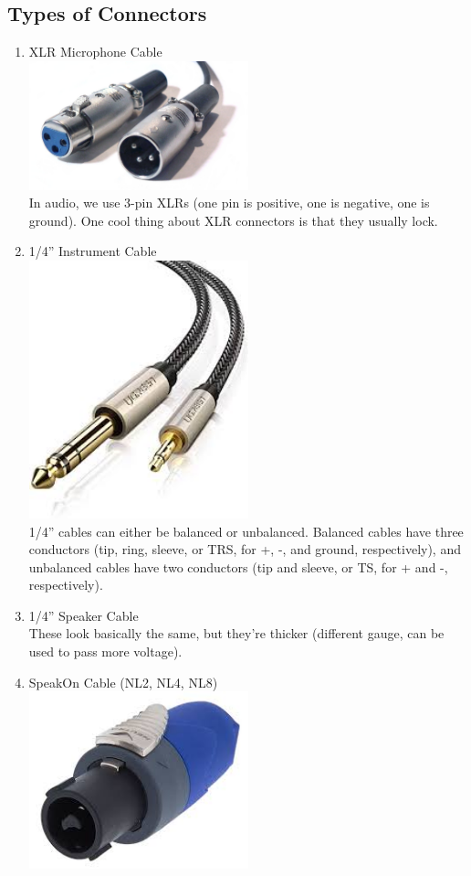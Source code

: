 \documentclass[a4paper]{article}
\begin{document}
\subsection{Types of Connectors}
\begin{enumerate}
	\item XLR Microphone Cable\\
		\includegraphics[width=0.5\textwidth]{XLR.jpg}\\
		In audio, we use 3-pin XLRs (one pin is positive, one is
		negative, one is ground). One cool thing about XLR connectors
		is that they usually lock.
	\item 1/4'' Instrument Cable\\
		\includegraphics[width=0.5\textwidth]{Quarter.jpeg}\\
		1/4'' cables can either be balanced or unbalanced. Balanced
		cables have three conductors (tip, ring, sleeve, or TRS, for +,
		-, and ground, respectively), and
		unbalanced cables have two conductors (tip and sleeve, or TS,
		for + and -, respectively).
	\item 1/4'' Speaker Cable\\
		These look basically the same, but they're thicker (different
		gauge, can be used to pass more voltage).
	\item SpeakOn Cable (NL2, NL4, NL8)\\
		\includegraphics[width=0.5\textwidth]{NL2.jpeg}\\

\end{enumerate}
\end{document}
